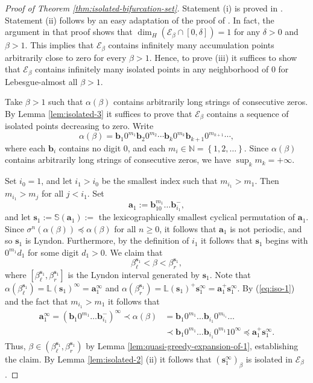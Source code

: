 \documentclass[12pt]{amsart}
\theoremstyle{definition}
\theoremstyle{remark}
\numberwithin{equation}{section}
\newcommand{\N}{\ensuremath{\mathbb{N}}}
\renewcommand{\L}{\ensuremath{\mathbb{L}}}
\renewcommand{\S}{\ensuremath{\mathbb{S}}}
\renewcommand{\a}{ {\mathbf{a}}}
\renewcommand{\b}{ {\mathbf{b}}}
\newcommand{\s}{ {\mathbf{s}}}
\newcommand{\E}{\mathscr{E}}
\newcommand{\set}[1]{\left\{#1\right\}}
\newcommand{\f}{\infty}
\newcommand{\de}{\delta}
\newcommand{\al}{\alpha}
\newcommand{\lle}{\preccurlyeq}
\renewcommand{\a}{ \mathbf{a}}
\newcommand{\si}{\sigma}
\begin{document}
{\begin{proof}[Proof of Theorem \ref{thm:isolated-bifurcation-set}]
Statement (i) is proved in \cite[Lemma 3.1]{Allaart-Kong-2023}.
Statement (ii) follows by an easy adaptation of the proof of \cite[Proposition 2.7]{Kalle-Kong-Langeveld-Li-18}. In fact, the argument in that proof shows that $\dim_H (\E_\beta\cap[0,\de])=1$ for any $\de>0$ and $\beta>1$. This implies that $\E_\beta$ contains infinitely many accumulation points arbitrarily close to zero for every $\beta>1$. Hence, to prove (iii) it suffices to show that $\E_\beta$ contains infinitely many isolated points in any neighborhood of $0$ for Lebesgue-almost all $\beta>1$.

Take $\beta>1$ such that $\al(\beta)$ contains arbitrarily long strings of consecutive zeros. By Lemma \ref{lem:isolated-3} it suffices to prove that $\E_\beta$ contains a sequence of isolated points decreasing to zero. Write
  \begin{equation}  \label{eq:iso-1}
    \al(\beta)=\b_1 0^{m_1}\b_2 0^{m_2}\cdots\b_k 0^{m_k}\b_{k+1}0^{m_{k+1}}\cdots,
  \end{equation}
  where each $\b_i$ contains no digit $0$, and each $m_i\in\N=\set{1,2,\ldots}$. Since $\al(\beta)$ contains arbitrarily long strings of consecutive zeros, we have $\sup_k m_k=+\f$.

  Set $i_0=1$, and let $i_1>i_0$ be the smallest index such that $m_{i_1}>m_1$. Then $m_{i_1}>m_j$ for all $j<i_1$. Set
  \[
	\a_1:=\b_10^{m_1}\ldots \b_{i_1}^-,
	\]
and let $\s_1:=\S(\a_1):=$ the lexicographically smallest cyclical permutation of $\a_1$.	
Since $\si^n(\al(\beta))\lle \al(\beta)$ for all $n\ge 0$, it follows that $\a_1$ is not periodic, and so $\s_1$ is Lyndon. Furthermore, by the definition of $i_1$ it follows that $\s_1$ begins with $0^{m_{1}}d_1$ for some digit $d_1>0$. We claim that
   \[
	\beta_\ell^{\s_1}<\beta<\beta_r^{\s_1},
	\]
where $[\beta_\ell^{\s_1}, \beta_r^{\s_1}]$ is the Lyndon interval generated by $\s_1$.
Note that $\al(\beta_\ell^{\s_1})=\L(\s_1)^\f=\a_1^\f$ and $\al(\beta_r^{\s_1})=\L(\s_1)^+\s_1^\f=\a_1^+\s_1^\f$. By (\ref{eq:iso-1}) and the fact that $m_{i_1}>m_1$ it follows that
  \begin{align*}
    \a_1^\f=(\b_1 0^{m_1}\ldots \b_{i_1}^-)^\f\prec \al(\beta)&=\b_1 0^{m_1}\ldots \b_{i_1}0^{m_{i_1}}\ldots\\
    &\prec \b_1 0^{m_1}\ldots \b_{i_1}0^{m_1}10^\f \lle\a_1^+\s_1^\f.
  \end{align*}
Thus, $\beta\in(\beta_\ell^{\s_1}, \beta_r^{\s_1})$ by Lemma \ref{lem:quasi-greedy-expansion-of-1}, establishing the claim. By Lemma \ref{lem:isolated-2} (ii) it follows that $(\s_1^\f)_\beta$ is isolated in $\E_\beta$.


\end{proof}}
\end{document}
